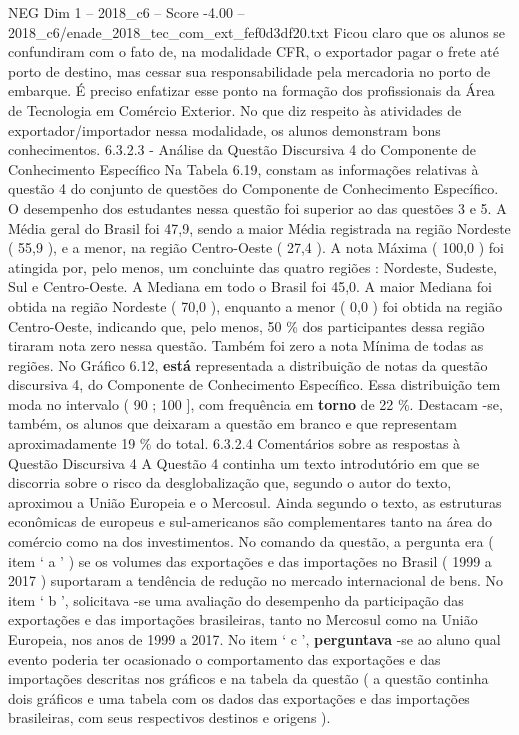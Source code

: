 \begin{textsample}{NEG Dim 1 – 2018\_c6 – Score -4.00 – 2018\_c6/enade\_2018\_tec\_com\_ext\_fef0d3df20.txt}
Ficou claro que os alunos se confundiram com o fato de, na modalidade CFR, o exportador pagar o frete até porto de destino, mas cessar sua responsabilidade pela mercadoria no porto de embarque.
É preciso enfatizar esse ponto na formação dos profissionais da Área de Tecnologia em Comércio Exterior.
No que diz respeito às atividades de exportador/importador nessa modalidade, os alunos demonstram bons conhecimentos. 6.3.2.3 - Análise da Questão Discursiva 4 do Componente de Conhecimento Específico Na Tabela 6.19, constam as informações relativas à questão 4 do conjunto de questões do Componente de Conhecimento Específico.
O desempenho dos estudantes nessa questão foi superior ao das questões 3 e 5.
A Média geral do Brasil foi 47,9, sendo a maior Média registrada na região Nordeste ( 55,9 ), e a menor, na região Centro-Oeste ( 27,4 ).
A nota Máxima ( 100,0 ) foi atingida por, pelo menos, um concluinte das quatro regiões : Nordeste, Sudeste, Sul e Centro-Oeste.
A Mediana em todo o Brasil foi 45,0.
A maior Mediana foi obtida na região Nordeste ( 70,0 ), enquanto a menor ( 0,0 ) foi obtida na região Centro-Oeste, indicando que, pelo menos, 50 \% dos participantes dessa região tiraram nota zero nessa questão.
Também foi zero a nota Mínima de todas as regiões.
No Gráfico 6.12, \textbf{está} representada a distribuição de notas da questão discursiva 4, do Componente de Conhecimento Específico.
Essa distribuição tem moda no intervalo ( 90 ; 100 ], com frequência em \textbf{torno} de 22 \%.
Destacam -se, também, os alunos que deixaram a questão em branco e que representam aproximadamente 19 \% do total. 6.3.2.4 Comentários sobre as respostas à Questão Discursiva 4 A Questão 4 continha um texto introdutório em que se discorria sobre o risco da desglobalização que, segundo o autor do texto, aproximou a União Europeia e o Mercosul.
Ainda segundo o texto, as estruturas econômicas de europeus e sul-americanos são complementares tanto na área do comércio como na dos investimentos.
No comando da questão, a pergunta era ( item ‘ a ’ ) se os volumes das exportações e das importações no Brasil ( 1999 a 2017 ) suportaram a tendência de redução no mercado internacional de bens.
No item ‘ b ’, solicitava -se uma avaliação do desempenho da participação das exportações e das importações brasileiras, tanto no Mercosul como na União Europeia, nos anos de 1999 a 2017.
No item ‘ c ’, \textbf{perguntava} -se ao aluno qual evento poderia ter ocasionado o comportamento das exportações e das importações descritas nos gráficos e na tabela da questão ( a questão continha dois gráficos e uma tabela com os dados das exportações e das importações brasileiras, com seus respectivos destinos e origens ).

\end{textsample}
